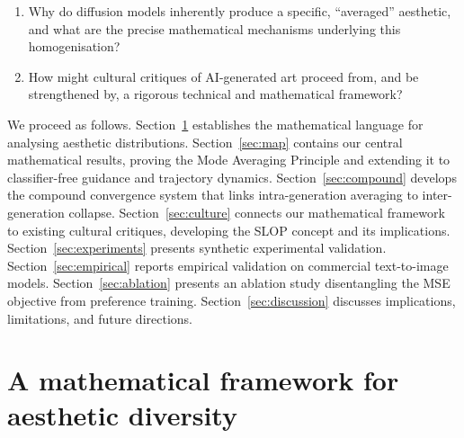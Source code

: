\documentclass[11pt]{article}
\begin{document}
\begin{enumerate}
 \item Why do diffusion models inherently produce a specific, ``averaged'' aesthetic, and what are the precise mathematical mechanisms underlying this homogenisation?
 \item How might cultural critiques of AI-generated art proceed from, and be strengthened by, a rigorous technical and mathematical framework?
\end{enumerate}

We proceed as follows. Section~\ref{sec:framework} establishes the mathematical language for analysing aesthetic distributions. Section~\ref{sec:map} contains our central mathematical results, proving the Mode Averaging Principle and extending it to classifier-free guidance and trajectory dynamics. Section~\ref{sec:compound} develops the compound convergence system that links intra-generation averaging to inter-generation collapse. Section~\ref{sec:culture} connects our mathematical framework to existing cultural critiques, developing the SLOP concept and its implications. Section~\ref{sec:experiments} presents synthetic experimental validation. Section~\ref{sec:empirical} reports empirical validation on commercial text-to-image models. Section~\ref{sec:ablation} presents an ablation study disentangling the MSE objective from preference training. Section~\ref{sec:discussion} discusses implications, limitations, and future directions.

\section{A mathematical framework for aesthetic diversity}\label{sec:framework}
\end{document}
